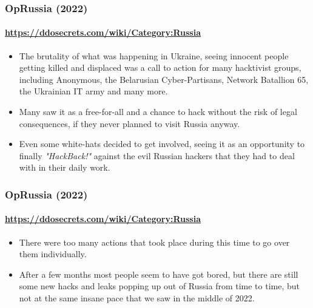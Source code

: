 \documentclass[aspectratio=169,usenames,dvipsnames]{beamer}
\begin{document}
\begin{frame}
  \frametitle{OpRussia (2022)}
  \framesubtitle{\url{https://ddosecrets.com/wiki/Category:Russia}}

  \begin{itemize}[<+->]
    \item The brutality of what was happening in Ukraine, seeing innocent
      people getting killed and displaced was a call to action for many
      hacktivist groups, including Anonymous, the Belarusian Cyber-Partisans,
      Network Batallion 65, the Ukrainian IT army and many more.
    \item Many saw it as a free-for-all and a chance to hack without the risk
      of legal consequences, if they never planned to visit Russia anyway.
    \item Even some white-hats decided to get involved, seeing it as an
      opportunity to finally \emph{"HackBack!"} against the evil Russian
      hackers that they had to deal with in their daily work.
  \end{itemize}

\end{frame}

\begin{frame}
  \frametitle{OpRussia (2022)}
  \framesubtitle{\url{https://ddosecrets.com/wiki/Category:Russia}}

  \begin{itemize}[<+->]
    \item There were too many actions that took place during this time to go
      over them individually.
    \item After a few months most people seem to have got bored, but there
      are still some new hacks and leaks popping up out of Russia from time
      to time, but not at the same insane pace that we saw in the middle of
      2022.
  \end{itemize}

\end{frame}
\end{document}
